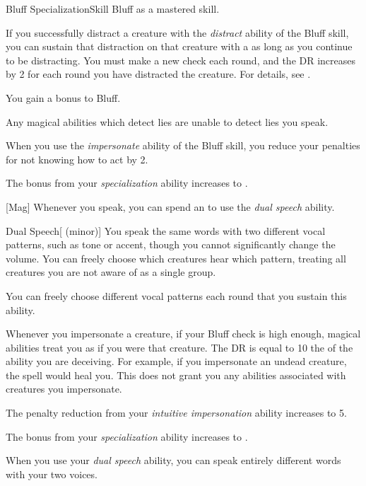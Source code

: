     \begin{feat}{Bluff Specialization}{Skill}
        \featpre Bluff as a mastered skill.

         If you successfully distract a creature with the \textit{distract} ability of the Bluff skill, you can sustain that distraction on that creature with a  as long as you continue to be distracting.
        You must make a new check each round, and the DR increases by 2 for each round you have distracted the creature.
        For details, see .

         You gain a  bonus to Bluff.

         Any magical abilities which detect lies are unable to detect lies you speak.

         When you use the \textit{impersonate} ability of the Bluff skill, you reduce your penalties for not knowing how to act by 2.

         The bonus from your \textit{specialization} ability increases to .

        [Mag] Whenever you speak, you can spend an  to use the \textit{dual speech} ability.
        \begin{ability}{Dual Speech}[ (minor)]
            You speak the same words with two different vocal patterns, such as tone or accent, though you cannot significantly change the volume.
            You can freely choose which creatures hear which pattern, treating all creatures you are not aware of as a single group.

            You can freely choose different vocal patterns each round that you sustain this ability.
        \end{ability}

         Whenever you impersonate a creature, if your Bluff check is high enough, magical abilities treat you as if you were that creature.
        The DR is equal to 10 \add the  of the ability you are deceiving.
        For example, if you impersonate an undead creature, the  spell would heal you.
        This does not grant you any abilities associated with creatures you impersonate.

         The penalty reduction from your \textit{intuitive impersonation} ability increases to 5.

         The bonus from your \textit{specialization} ability increases to .

         When you use your \textit{dual speech} ability, you can speak entirely different words with your two voices.
    \end{feat}


